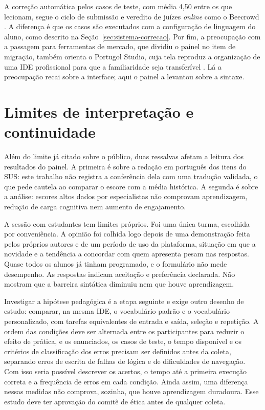 A correção automática pelos casos de teste, com média 4,50 entre os que lecionam, segue o ciclo de submissão e veredito de juízes \textit{online} como o Beecrowd \cite{beecrowd2026faq}. A diferença é que os casos são executados com a configuração de linguagem do aluno, como descrito na Seção~\ref{sec:sistema-correcao}. Por fim, a preocupação com a passagem para ferramentas de mercado, que dividiu o painel no item de migração, também orienta o Portugol Studio, cuja tela reproduz a organização de uma IDE profissional para que a familiaridade seja transferível \cite{univali2026}. Lá a preocupação recai sobre a interface; aqui o painel a levantou sobre a sintaxe.

\section{Limites de interpretação e continuidade}
\label{subsec:limites-interpretacao}

Além do limite já citado sobre o público, duas ressalvas afetam a leitura dos resultados do painel. A primeira é sobre a redação em português dos itens do SUS: este trabalho não registra a conferência dela com uma tradução validada, o que pede cautela ao comparar o escore com a média histórica. A segunda é sobre a análise: escores altos dados por especialistas não comprovam aprendizagem, redução de carga cognitiva nem aumento de engajamento.

A sessão com estudantes tem limites próprios. Foi uma única turma, escolhida por conveniência. A opinião foi colhida logo depois de uma demonstração feita pelos próprios autores e de um período de uso da plataforma, situação em que a novidade e a tendência a concordar com quem apresenta pesam nas respostas. Quase todos os alunos já tinham programado, e o formulário não mede desempenho. As respostas indicam aceitação e preferência declarada. Não mostram que a barreira sintática diminuiu nem que houve aprendizagem.

Investigar a hipótese pedagógica é a etapa seguinte e exige outro desenho de estudo: comparar, na mesma IDE, o vocabulário padrão e o vocabulário personalizado, com tarefas equivalentes de entrada e saída, seleção e repetição. A ordem das condições deve ser alternada entre os participantes para reduzir o efeito de prática, e os enunciados, os casos de teste, o tempo disponível e os critérios de classificação dos erros precisam ser definidos antes da coleta, separando erros de escrita de falhas de lógica e de dificuldades de navegação. Com isso seria possível descrever os acertos, o tempo até a primeira execução correta e a frequência de erros em cada condição. Ainda assim, uma diferença nessas medidas não comprova, sozinha, que houve aprendizagem duradoura. Esse estudo deve ter aprovação do comitê de ética antes de qualquer coleta.

